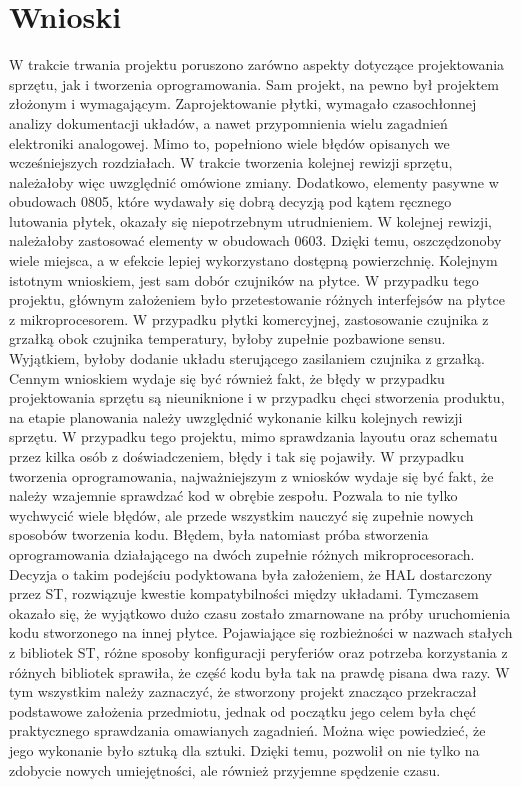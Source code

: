\chapter{Wnioski}
\label{cha:results}
W trakcie trwania projektu poruszono zarówno aspekty dotyczące projektowania sprzętu, jak i tworzenia oprogramowania. Sam projekt, na pewno był projektem złożonym i wymagającym. Zaprojektowanie płytki, wymagało czasochłonnej analizy dokumentacji układów, a nawet przypomnienia wielu zagadnień elektroniki analogowej. Mimo to, popełniono wiele błędów opisanych we wcześniejszych rozdziałach. W trakcie tworzenia kolejnej rewizji sprzętu, należałoby więc uwzględnić omówione zmiany. Dodatkowo, elementy pasywne w obudowach 0805, które wydawały się dobrą decyzją pod kątem ręcznego lutowania płytek, okazały się niepotrzebnym utrudnieniem. W kolejnej rewizji, należałoby zastosować elementy w obudowach 0603. Dzięki temu, oszczędzonoby wiele miejsca, a w efekcie lepiej wykorzystano dostępną powierzchnię. Kolejnym istotnym wnioskiem, jest sam dobór czujników na płytce. W przypadku tego projektu, głównym założeniem było przetestowanie różnych interfejsów na płytce z mikroprocesorem. W przypadku płytki komercyjnej, zastosowanie czujnika z grzałką obok czujnika temperatury, byłoby zupełnie pozbawione sensu. Wyjątkiem, byłoby dodanie układu sterującego zasilaniem czujnika z grzałką. Cennym wnioskiem wydaje się być również fakt, że błędy w przypadku projektowania sprzętu są nieuniknione i w przypadku chęci stworzenia produktu, na etapie planowania należy uwzględnić wykonanie kilku kolejnych rewizji sprzętu. W przypadku tego projektu, mimo sprawdzania layoutu oraz schematu przez kilka osób z doświadczeniem, błędy i tak się pojawiły. W przypadku tworzenia oprogramowania, najważniejszym z wniosków wydaje się być fakt, że należy wzajemnie sprawdzać kod w obrębie zespołu. Pozwala to nie tylko wychwycić wiele błędów, ale przede wszystkim nauczyć się zupełnie nowych sposobów tworzenia kodu. Błędem, była natomiast próba stworzenia oprogramowania działającego na dwóch zupełnie różnych mikroprocesorach. Decyzja o takim podejściu podyktowana była założeniem, że HAL dostarczony przez ST, rozwiązuje kwestie kompatybilności między układami. Tymczasem okazało się, że wyjątkowo dużo czasu zostało zmarnowane na próby uruchomienia kodu stworzonego na innej płytce. Pojawiające się rozbieżności w nazwach stałych z bibliotek ST, różne sposoby konfiguracji peryferiów oraz potrzeba korzystania z różnych bibliotek sprawiła, że część kodu była tak na prawdę pisana dwa razy.\newline
W tym wszystkim należy zaznaczyć, że stworzony projekt znacząco przekraczał podstawowe założenia przedmiotu, jednak od początku jego celem była chęć praktycznego sprawdzania omawianych zagadnień. Można więc powiedzieć, że jego wykonanie było sztuką dla sztuki. Dzięki temu, pozwolił on nie tylko na zdobycie nowych umiejętności, ale również przyjemne spędzenie czasu.
